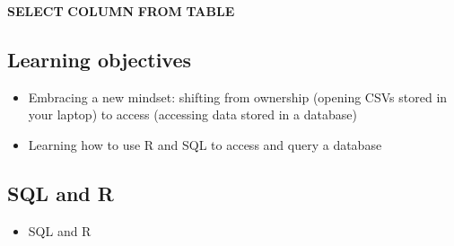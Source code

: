 \documentclass[
]{book}
\newenvironment{Shaded}{\begin{snugshade}}{\end{snugshade}}
\newcommand{\KeywordTok}[1]{\textcolor[rgb]{0.13,0.29,0.53}{\textbf{#1}}}
\providecommand{\tightlist}{%
  \setlength{\itemsep}{0pt}\setlength{\parskip}{0pt}}
\begin{document}
\begin{Shaded}
\begin{Highlighting}[]
\KeywordTok{SELECT} \KeywordTok{COLUMN} \KeywordTok{FROM} \KeywordTok{TABLE} 
\end{Highlighting}
\end{Shaded}

\hypertarget{learning-objectives}{%
\subsection{Learning objectives}\label{learning-objectives}}

\begin{itemize}
\item
  Embracing a new mindset: shifting from ownership (opening CSVs stored in your laptop) to access (accessing data stored in a database)
\item
  Learning how to use R and SQL to access and query a database
\end{itemize}

\hypertarget{sql-and-r}{%
\subsection{SQL and R}\label{sql-and-r}}

\begin{itemize}
\tightlist
\item
  SQL and R
\end{itemize}
\end{document}
